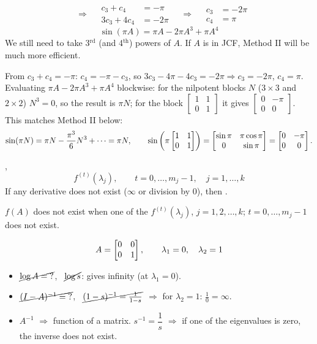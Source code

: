 \begin{example}
\[\quad\Rightarrow\quad
\begin{aligned} c_3 + c_4 &= -\pi\\ 3c_3 + 4c_4 &= -2\pi\end{aligned}
\quad\Rightarrow\quad
\boxed{\begin{aligned} c_3 &= -2\pi\\ c_4 &= \pi\end{aligned}}
\]
\[
\boxed{\sin(\pi A) = \pi A - 2\pi A^3 + \pi A^4}
\]
We still need to take 3$^{\text{rd}}$ (and 4$^{\text{th}}$) powers of $A$. If $A$ is in JCF, Method II will be much more efficient.
\begin{insight}[Check]
From $c_3+c_4=-\pi$: $c_4=-\pi-c_3$, so $3c_3-4\pi-4c_3=-2\pi \Rightarrow c_3=-2\pi$, $c_4=\pi$. Evaluating $\pi A-2\pi A^3+\pi A^4$ blockwise: for the nilpotent blocks $N$ ($3\times3$ and $2\times2$) $N^3=0$, so the result is $\pi N$; for the block $\left[\begin{smallmatrix}1&1\\0&1\end{smallmatrix}\right]$ it gives $\left[\begin{smallmatrix}0&-\pi\\0&0\end{smallmatrix}\right]$. This matches Method II below:
\[
\sin(\pi N)=\pi N-\frac{\pi^3}{6}N^3+\dots=\pi N,
\qquad
\sin\left(\pi\begin{bmatrix}1&1\\0&1\end{bmatrix}\right)=\begin{bmatrix}\sin\pi & \pi\cos\pi\\ 0&\sin\pi\end{bmatrix}=\begin{bmatrix}0&-\pi\\0&0\end{bmatrix}.
\]
\end{insight}
\end{example}

\sep
\[
f^{(t)}(\lambda_j), \qquad t = 0,\dots,m_j-1, \quad j = 1,\dots,k
\]
If any derivative does not exist ($\infty$ or division by 0), then .

\begin{remark}
$f(A)$ does not exist when one of the $f^{(t)}(\lambda_j)$, $j = 1,2,\dots,k$; $t = 0,\dots,m_j-1$ does not exist.
\end{remark}

\begin{example}
\[
A = \begin{bmatrix}0&0\\0&1\end{bmatrix}, \qquad \lambda_1 = 0, \quad \lambda_2 = 1
\]
\begin{itemize}
\item $\cancel{\log A = {?}}$, \ $\cancel{\log s}$: gives infinity (at $\lambda_1=0$).
\item $\cancel{(I-A)^{-1} = {?}}$, \ $\cancel{(1-s)^{-1} = \tfrac{1}{1-s}}$ $\Rightarrow$ for $\lambda_2 = 1$: $\tfrac{1}{0} = \infty$.
\item $A^{-1}$ $\Longrightarrow$ function of a matrix. $s^{-1} = \dfrac1s$ $\Rightarrow$ if one of the eigenvalues is zero, the inverse does not exist.
\end{itemize}
\end{example}

